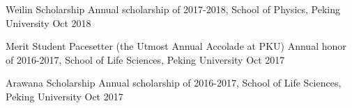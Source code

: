 \begin{cvhonors}

\cvhonor
{Weilin Scholarship} %
{Annual scholarship of 2017-2018, School of Physics, Peking University} %
{Oct 2018} %


\cvhonor
{Merit Student Pacesetter (the Utmost Annual Accolade at PKU)} %
{Annual honor of 2016-2017, School of Life Sciences, Peking University} %
{Oct 2017} %


\cvhonor
{Arawana Scholarship} %
{Annual scholarship of 2016-2017, School of Life Sciences, Peking University} %
{Oct 2017} %





\end{cvhonors}
